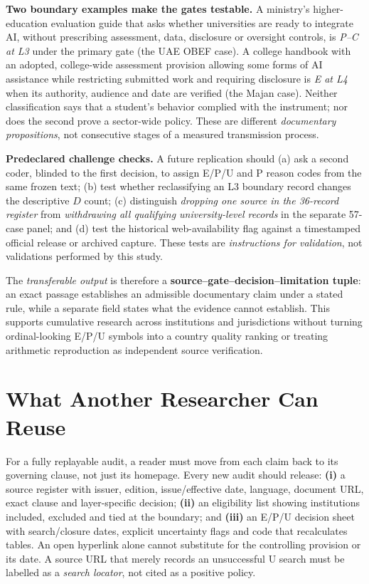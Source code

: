 \documentclass[conference,letterpaper]{IEEEtran}
\begin{document}
\textbf{Two boundary examples make the gates testable.} A ministry's higher-education evaluation guide that asks whether universities are ready to integrate AI, without prescribing assessment, data, disclosure or oversight controls, is \emph{P--C at L3} under the primary gate (the UAE OBEF case). A college handbook with an adopted, college-wide assessment provision allowing some forms of AI assistance while restricting submitted work and requiring disclosure is \emph{E at L4} when its authority, audience and date are verified (the Majan case). Neither classification says that a student's behavior complied with the instrument; nor does the second prove a sector-wide policy. These are different \emph{documentary propositions}, not consecutive stages of a measured transmission process.

\textbf{Predeclared challenge checks.} A future replication should (a) ask a second coder, blinded to the first decision, to assign E/P/U and P reason codes from the same frozen text; (b) test whether reclassifying an L3 boundary record changes the descriptive $D$ count; (c) distinguish \emph{dropping one source in the 36-record register} from \emph{withdrawing all qualifying university-level records} in the separate 57-case panel; and (d) test the historical web-availability flag against a timestamped official release or archived capture. These tests are \emph{instructions for validation}, not validations performed by this study.

The \emph{transferable output} is therefore a \textbf{source--gate--decision--limitation tuple}: an exact passage establishes an admissible documentary claim under a stated rule, while a separate field states what the evidence cannot establish. This supports cumulative research across institutions and jurisdictions without turning ordinal-looking E/P/U symbols into a country quality ranking or treating arithmetic reproduction as independent source verification.

\section{What Another Researcher Can Reuse}
For a fully replayable audit, a reader must move from each claim back to its governing clause, not just its homepage. Every new audit should release: \textbf{(i)} a source register with issuer, edition, issue/effective date, language, document URL, exact clause and layer-specific decision; \textbf{(ii)} an eligibility list showing institutions included, excluded and tied at the boundary; and \textbf{(iii)} an E/P/U decision sheet with search/closure dates, explicit uncertainty flags and code that recalculates tables. An open hyperlink alone cannot substitute for the controlling provision or its date. A source URL that merely records an unsuccessful U search must be labelled as a \emph{search locator}, not cited as a positive policy.
\end{document}
